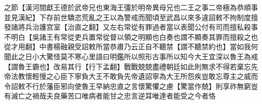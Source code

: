 之節【漢河間獻王德於武帝兄也東海王彊於明帝異母兄也二王之事二帝極為恭順事並見漢紀】下存前世驕恣荒亂之王以為警戒而聞頃至武昌以來多違詔敕不拘制度擅發諸將兵治護宫室【治直之翻】又左右常從有罪過者當以表聞公付有司而擅私殺事不明白【吳諸王有常從吏兵置常從督以領之明顯也白奏也謂不顯奏其罪而擅殺之也從才用翻】中書楊融親受詔敕所當恭肅乃云正自不聽禁【謂不聽禁約也】當如我何聞此之日小大驚怪莫不寒心里語曰明鑑所以照形古事所以知今大王宜深以魯王為戒【謂魯王霸也】改易其行【行下孟翻】戰戰兢兢盡禮朝廷如此則無求不得若棄忘先帝法教懷輕慢之心臣下寧負大王不敢負先帝遺詔寧為大王所怨疾豈敢忘尊主之威而令詔敕不行於藩臣邪向使魯王早納忠直之言懷驚懼之慮【驚當作兢】則享祚無窮豈有滅亡之禍哉夫良藥苦口唯病者能甘之忠言逆耳唯達者能受之今者恪
